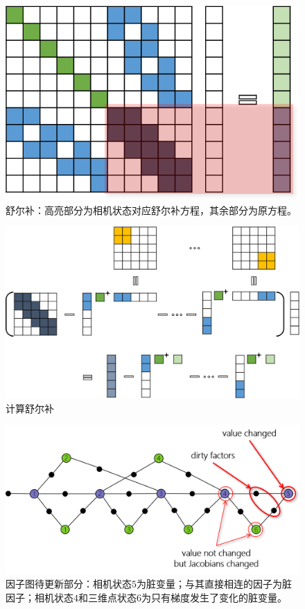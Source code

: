 \begin{figure}[htb!]
    \centering
    \includegraphics{figs/reduced_sys.png}
    \caption{舒尔补：高亮部分为相机状态对应舒尔补方程，其余部分为原方程。}
    \label{fig:reduced_sys}
\end{figure}

\begin{figure}[htb!]
    \centering
    \includegraphics[width=\textwidth]{figs/schur_complement.png}
    \caption{计算舒尔补}
    \label{fig:schur_complement}
\end{figure}

\begin{figure}[htb!]
    \centering
    \includegraphics[width=.8\textwidth]{figs/factor_graph_dirty.png}
    \caption{因子图待更新部分：相机状态$5$为脏变量；与其直接相连的因子为脏因子；相机状态$4$和三维点状态$6$为只有梯度发生了变化的脏变量。}
    \label{fig:factor_graph_dirty}
\end{figure}

